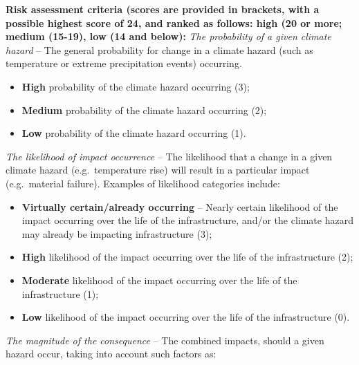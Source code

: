 \documentclass[
]{book}
\begin{document}
\textbf{Risk assessment criteria (scores are provided in brackets, with a possible highest score of 24, and ranked as follows: high (20 or more; medium (15-19), low (14 and below):}
\emph{The probability of a given climate hazard} -- The general probability for change in a climate hazard (such as temperature or extreme precipitation events) occurring.

\begin{itemize}
\item
  \textbf{High} probability of the climate hazard occurring (3);
\item
  \textbf{Medium} probability of the climate hazard occurring (2);
\item
  \textbf{Low} probability of the climate hazard occurring (1).
\end{itemize}

\emph{The likelihood of impact occurrence} -- The likelihood that a change in a given climate hazard (e.g.~temperature rise) will result in a particular impact (e.g.~material failure). Examples of likelihood categories include:

\begin{itemize}
\item
  \textbf{Virtually certain/already occurring} -- Nearly certain likelihood of the impact occurring over the life of the infrastructure, and/or the climate hazard may already be impacting infrastructure (3);
\item
  \textbf{High} likelihood of the impact occurring over the life of the infrastructure (2);
\item
  \textbf{Moderate} likelihood of the impact occurring over the life of the infrastructure (1);
\item
  \textbf{Low} likelihood of the impact occurring over the life of the infrastructure (0).
\end{itemize}

\emph{The magnitude of the consequence} -- The combined impacts, should a given hazard occur, taking into account such factors as:
\end{document}
